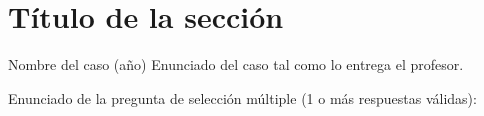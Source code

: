 \section{Título de la sección}

\begin{caso}{Nombre del caso (año)}
Enunciado del caso tal como lo entrega el profesor.
\end{caso}

\begin{fuentes}
\end{fuentes}

\begin{respuesta}
\end{respuesta}

\begin{mcq}{Enunciado de la pregunta de selección múltiple (1 o más respuestas válidas):}
\end{mcq}
